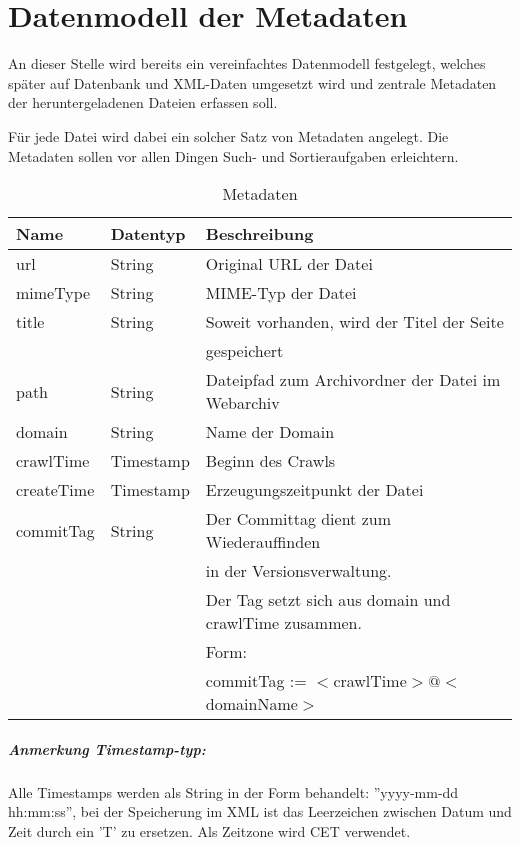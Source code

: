 \chapter{Datenmodell der Metadaten} \label{spec:model}
An dieser Stelle wird bereits ein vereinfachtes Datenmodell festgelegt, 
welches später auf Datenbank und XML-Daten umgesetzt wird und zentrale Metadaten 
der heruntergeladenen Dateien erfassen soll. 

Für jede Datei wird dabei ein solcher Satz von Metadaten angelegt.
Die Metadaten sollen vor allen Dingen Such- und Sortieraufgaben erleichtern. 

\begin{table}[h]
\centering
\begin{tabular}{|l|l|l|}	
	\hline
	Name 		& Datentyp 				& Beschreibung \\
	\hline
	url 		& String 				& Original URL der Datei\\
	\hline
	mimeType	& String 				& MIME-Typ der Datei\\
	\hline
	title 		& String 				& Soweit vorhanden, wird der Titel der Seite \\ 
	 			& 						& gespeichert \\ 
	\hline
	path 		& String 				& Dateipfad zum Archivordner der Datei im Webarchiv \\
	\hline
	domain 		& String 				& Name der Domain \\
	\hline
	crawlTime 	& Timestamp 			& Beginn des Crawls \\
	\hline
	createTime 	& Timestamp 			& Erzeugungszeitpunkt der Datei \\
	\hline
	commitTag 	& String 				& Der Committag dient zum Wiederauffinden \\
	 			& 		 				& in der Versionsverwaltung. \\ 
				& 						& Der Tag setzt sich aus domain und crawlTime zusammen.\\
				&  						& Form: \\
				&  						& commitTag := $<$crawlTime$>@<$domainName$>$ \\
	\hline
\end{tabular}
\caption{Metadaten}
\end{table}

\paragraph{Anmerkung Timestamp-typ:}
Alle Timestamps werden als String in der Form behandelt:
''yyyy-mm-dd hh:mm:ss'', bei der Speicherung im XML ist das Leerzeichen zwischen Datum und Zeit durch ein 'T' zu ersetzen. Als Zeitzone wird CET verwendet.

